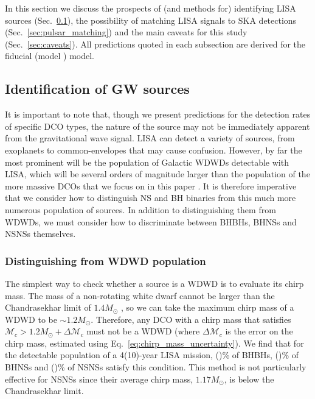 In this section we discuss the prospects of (and methods for) identifying LISA sources (Sec.~\ref{sec:identify_sources}), the possibility of matching LISA signals to SKA detections (Sec.~\ref{sec:pulsar_matching}) and the main caveats for this study (Sec.~\ref{sec:caveats}). All predictions quoted in each subsection are derived for the fiducial (model \modFid{}) model.

\subsection{Identification of GW sources}\label{sec:identify_sources}
It is important to note that, though we present predictions for the detection rates of specific DCO types, the nature of the source may not be immediately apparent from the gravitational wave signal. LISA can detect a variety of sources, from exoplanets \citep[e.g.][]{Tamanini+2019} to common-envelopes \citep[e.g.][]{Ginat+2020, Renzo+2021} that may cause confusion. However, by far the most prominent will be the population of Galactic WDWDs detectable with LISA, which will be several orders of magnitude larger than the population of the more massive DCOs that we focus on in this paper \citep[e.g.][]{Korol+2017}. It is therefore imperative that we consider how to distinguish NS and BH binaries from this much more numerous population of sources. In addition to distinguishing them from WDWDs, we must consider how to discriminate between BHBHs, BHNSs and NSNSs themselves.

\subsubsection{Distinguishing from WDWD population}\label{sec:WDWD_distinguish}
The simplest way to check whether a source is a WDWD is to evaluate its chirp mass. The mass of a non-rotating white dwarf cannot be larger than the Chandrasekhar limit of $1.4 \unit{M_\odot}$ \citep{Chandrasekhar+1931, Hamada+1961}, so we can take the maximum chirp mass of a WDWD to be $\sim 1.2 \unit{M_{\odot}}$. Therefore, any DCO with a chirp mass that satisfies $\mathcal{M}_c > 1.2 \unit{M_{\odot}} + \Delta \mathcal{M}_c$ must not be a WDWD (where $\Delta \mathcal{M}_c$ is the error on the chirp mass, estimated using Eq.~\ref{eq:chirp_mass_uncertainty}). We find that for the detectable population of a 4(10)-year LISA mission, \BHBHAboveMaxWDWDFourPerc{}(\BHBHAboveMaxWDWDTenPerc{})\% of BHBHs, \BHNSAboveMaxWDWDFourPerc{}(\BHNSAboveMaxWDWDTenPerc{})\% of BHNSs and \NSNSAboveMaxWDWDFourPerc{}(\NSNSAboveMaxWDWDTenPerc{})\% of NSNSs satisfy this condition. This method is not particularly effective for NSNSs since their average chirp mass, $1.17 \unit{M_\odot}$, is below the Chandrasekhar limit.

